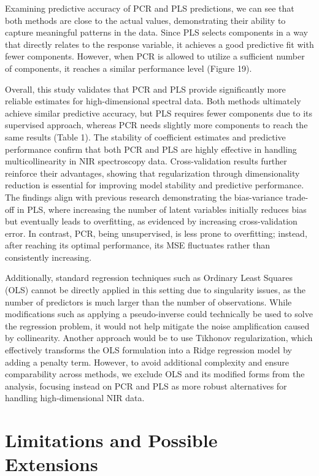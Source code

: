 \documentclass[11pt,twoside,a4paper]{article}
\begin{document}
Examining predictive accuracy of PCR and PLS predictions, we can see that both methods are close to the actual values, demonstrating their ability to capture meaningful patterns in the data. Since PLS selects components in a way that directly relates to the response variable, it achieves a good predictive fit with fewer components. However, when PCR is allowed to utilize a sufficient number of components, it reaches a similar performance level (Figure 19).



Overall, this study validates that PCR and PLS provide significantly more reliable estimates for high-dimensional spectral data. Both methods ultimately achieve similar predictive accuracy, but PLS requires fewer components due to its supervised approach, whereas PCR needs slightly more components to reach the same results (Table 1). The stability of coefficient estimates and predictive performance confirm that both PCR and PLS are highly effective in handling multicollinearity in NIR spectroscopy data. Cross-validation results further reinforce their advantages, showing that regularization through dimensionality reduction is essential for improving model stability and predictive performance. The findings align with previous research demonstrating the bias-variance trade-off in PLS, where increasing the number of latent variables initially reduces bias but eventually leads to overfitting, as evidenced by increasing cross-validation error. In contrast, PCR, being unsupervised, is less prone to overfitting; instead, after reaching its optimal performance, its MSE fluctuates rather than consistently increasing.

Additionally, standard regression techniques such as Ordinary Least Squares (OLS) cannot be directly applied in this setting due to singularity issues, as the number of predictors is much larger than the number of observations. While modifications such as applying a pseudo-inverse could technically be used to solve the regression problem, it would not help mitigate the noise amplification caused by collinearity. Another approach would be to use Tikhonov regularization, which effectively transforms the OLS formulation into a Ridge regression model by adding a penalty term. However, to avoid additional complexity and ensure comparability across methods, we exclude OLS and its modified forms from the analysis, focusing instead on PCR and PLS as more robust alternatives for handling high-dimensional NIR data.


\section{Limitations and Possible Extensions}
\end{document}
